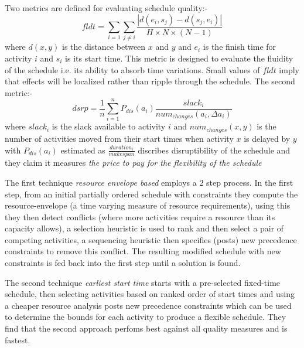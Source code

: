 Two metrics are defined for evaluating schedule quality:-
\begin{equation}
fldt = \sum_{i=1} \sum_{j \neq i} \frac { |d(e_i,s_j) - d(s_j, e_i)|}{ H \times N \times (N-1)}
\end{equation}
where $d(x,y)$ is the distance between $x$ and $y$ and $e_i$ is the finish time for activity $i$ and $s_i$ is its start time. This metric is designed to evaluate the fluidity of the schedule i.e. its ability to absorb time variations. Small values of $fldt$ imply that effects will be localized rather than ripple through the schedule. The second metric:-
\begin{equation}
dsrp = \frac{1}{n}\sum_{i=1}^{n} P_{dis}(a_i) \frac{slack_i}{num_{changes}(a_i, \Delta a_i)}
\end{equation}
where $slack_i$ is the slack available to activity $i$ and $num_{changes}(x,y)$ is the number of activities moved from their start times when activity $x$ is delayed by $y$ with $P_{dis}(a_i)$ estimated as $\frac {duration_i}{makespan}$ discribes disruptibility of the schedule and they claim it measures \emph{the price to pay for the flexibility of the schedule}

The first technique \emph{resource envelope based} employs a 2 step process. 
In the first step, from an initial partially ordered schedule with constraints they compute the resource-envelope (a time varying measure of resource requirements), using this they then detect conflicts (where more activities require a resource than its capacity allows), a selection heuristic is used to rank and then select a pair of competing activities, a sequencing heuristic then specifies (posts) new precedence constraints to remove this conflict. The resulting modified schedule with new constraints is fed back into the first step until a solution is found.

The second technique \emph{earliest start time} starts with a pre-selected fixed-time schedule, then selecting activities based on ranked order of start times and using a cheaper resource analysis posts new precedence constraints which can be used to determine the bounds for each activity to produce a flexible schedule. They find that the second approach perfoms best against all quality measures and is fastest.  


